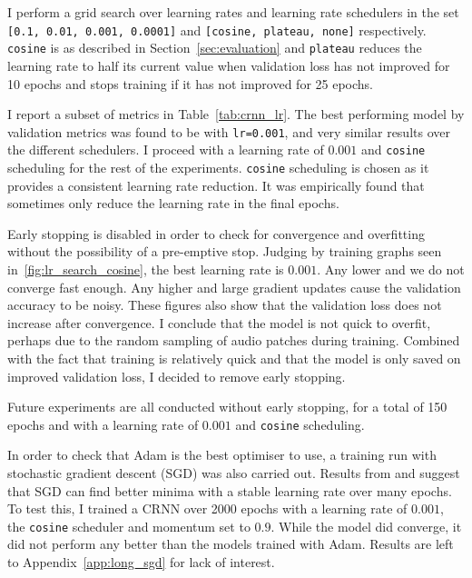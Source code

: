 I perform a grid search over learning rates and learning rate schedulers in the set \texttt{[0.1, 0.01, 0.001, 0.0001]} and \texttt{[cosine, plateau, none]} respectively. \texttt{cosine} is as described in Section~\ref{sec:evaluation} and \texttt{plateau} reduces the learning rate to half its current value when validation loss has not improved for 10 epochs and stops training if it has not improved for 25 epochs.

I report a subset of metrics in Table~\ref{tab:crnn_lr}. The best performing model by validation metrics was found to be with \texttt{lr=0.001}, and very similar results over the different schedulers. I proceed with a learning rate of $0.001$ and \texttt{cosine} scheduling for the rest of the experiments. \texttt{cosine} scheduling is chosen as it provides a consistent learning rate reduction. It was empirically found that  sometimes only reduce the learning rate in the final epochs.

Early stopping is disabled in order to check for convergence and overfitting without the possibility of a pre-emptive stop. Judging by training graphs seen in~\ref{fig:lr_search_cosine}, the best learning rate is $0.001$. Any lower and we do not converge fast enough. Any higher and large gradient updates cause the validation accuracy to be noisy. These figures also show that the validation loss does not increase after convergence. I conclude that the model is not quick to overfit, perhaps due to the random sampling of audio patches during training. Combined with the fact that training is relatively quick and that the model is only saved on improved validation loss, I decided to remove early stopping. 

Future experiments are all conducted without early stopping, for a total of 150 epochs and with a learning rate of $0.001$ and \texttt{cosine} scheduling.

In order to check that Adam is the best optimiser to use, a training run with stochastic gradient descent (SGD) was also carried out. Results from \citet{SGD1} and \citet{SGD2} suggest that SGD can find better minima with a stable learning rate over many epochs. To test this, I trained a CRNN over 2000 epochs with a learning rate of $0.001$, the \texttt{cosine} scheduler and momentum set to $0.9$. While the model did converge, it did not perform any better than the models trained with Adam. Results are left to Appendix~\ref{app:long_sgd} for lack of interest.

